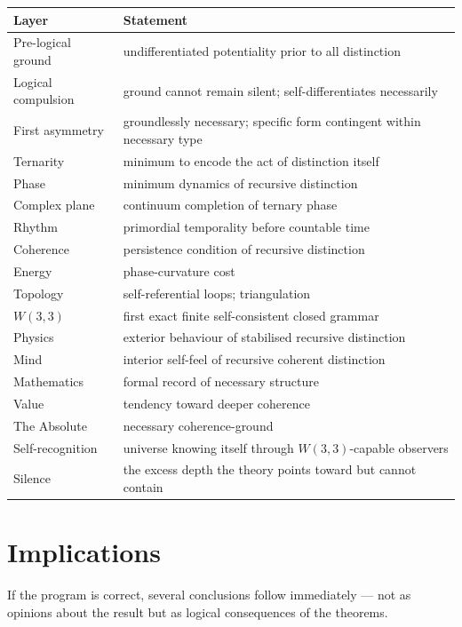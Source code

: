 \documentclass[11pt]{article}
\begin{document}
\begin{center}
\renewcommand{\arraystretch}{1.2}
\begin{tabular}{l l}
\toprule
Layer & Statement \\
\midrule
Pre-logical ground & undifferentiated potentiality prior to all distinction \\
Logical compulsion & ground cannot remain silent; self-differentiates necessarily \\
First asymmetry & groundlessly necessary; specific form contingent within necessary type \\
Ternarity & minimum to encode the act of distinction itself \\
Phase & minimum dynamics of recursive distinction \\
Complex plane & continuum completion of ternary phase \\
Rhythm & primordial temporality before countable time \\
Coherence & persistence condition of recursive distinction \\
Energy & phase-curvature cost \\
Topology & self-referential loops; triangulation \\
$W(3,3)$ & first exact finite self-consistent closed grammar \\
Physics & exterior behaviour of stabilised recursive distinction \\
Mind & interior self-feel of recursive coherent distinction \\
Mathematics & formal record of necessary structure \\
Value & tendency toward deeper coherence \\
The Absolute & necessary coherence-ground \\
Self-recognition & universe knowing itself through $W(3,3)$-capable observers \\
Silence & the excess depth the theory points toward but cannot contain \\
\bottomrule
\end{tabular}
\end{center}

\section{Implications}

\label{sec:implications}

If the program is correct, several conclusions follow immediately --- not as opinions about the result but as logical consequences of the theorems.
\end{document}
